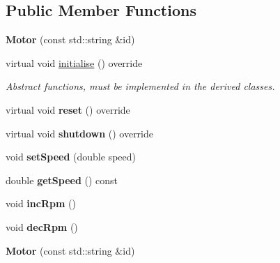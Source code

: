 \subsection*{Public Member Functions}
\begin{DoxyCompactItemize}
\item 
{\bfseries Motor} (const std\+::string \&id)\hypertarget{class_motor_aade6af850e0177846336ddd136b1f2c9}{}\label{class_motor_aade6af850e0177846336ddd136b1f2c9}

\item 
virtual void \hyperlink{class_motor_a7b47a09309764fdaeb8d6e6b2cac5c07}{initialise} () override\hypertarget{class_motor_a7b47a09309764fdaeb8d6e6b2cac5c07}{}\label{class_motor_a7b47a09309764fdaeb8d6e6b2cac5c07}

\begin{DoxyCompactList}\small\item\em Abstract functions, must be implemented in the derived classes. \end{DoxyCompactList}\item 
virtual void {\bfseries reset} () override\hypertarget{class_motor_a0d0d43531b4b8b9d37fb8f936dd0f53c}{}\label{class_motor_a0d0d43531b4b8b9d37fb8f936dd0f53c}

\item 
virtual void {\bfseries shutdown} () override\hypertarget{class_motor_a8ef8df58afeba551f02b8e4afbd23c50}{}\label{class_motor_a8ef8df58afeba551f02b8e4afbd23c50}

\item 
void {\bfseries set\+Speed} (double speed)\hypertarget{class_motor_a4aece812dc94b008a874e4b38c3a3863}{}\label{class_motor_a4aece812dc94b008a874e4b38c3a3863}

\item 
double {\bfseries get\+Speed} () const \hypertarget{class_motor_aa6ed19d9c4f2deb0bb38460e3572bdc4}{}\label{class_motor_aa6ed19d9c4f2deb0bb38460e3572bdc4}

\item 
void {\bfseries inc\+Rpm} ()\hypertarget{class_motor_a93a4de89dd6f493c165137a78e3d97b4}{}\label{class_motor_a93a4de89dd6f493c165137a78e3d97b4}

\item 
void {\bfseries dec\+Rpm} ()\hypertarget{class_motor_ac271f30175d294a9d27d50193840d61e}{}\label{class_motor_ac271f30175d294a9d27d50193840d61e}

\item 
{\bfseries Motor} (const std\+::string \&id)\hypertarget{class_motor_aade6af850e0177846336ddd136b1f2c9}{}\label{class_motor_aade6af850e0177846336ddd136b1f2c9}


\end{DoxyCompactItemize}
